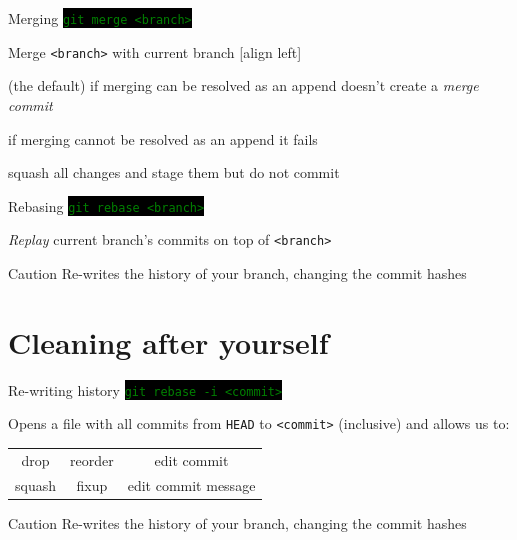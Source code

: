 \documentclass[
14pt,
aspectratio=169,
usenames,
dvipsnames,
x11names]{beamer}
\newcommand{\code}[1]{{\small\colorbox{black}{\textcolor{green}{\texttt{#1}}}}}
\begin{document}
\begin{frame}{Merging}
  \code{git merge <branch>}

  Merge \texttt{<branch>} with current branch
  [align left]
  \begin{description}[<+->] \setlength{\itemsep}{\fill}
  \item[\texttt{--ff~~~~~}] (the \alert{default}) if merging can be resolved as an append doesn't create a \textit{merge commit}
  \item[\texttt{--ff-only}] if merging cannot be resolved as an append it fails
  \item[\texttt{--squash~}] squash all changes and stage them but do not commit
  \end{description}

\end{frame}

\begin{frame}{Rebasing}
  \code{git rebase <branch>}

  \textit{Replay} current branch's commits on top of \texttt{<branch>}

  \vfill
  \pause

  \begin{alertblock}{Caution}
    Re-writes the history of your branch, changing the commit hashes
  \end{alertblock}
\end{frame}

\section{Cleaning after yourself}

\begin{frame}{Re-writing history}
  \code{git rebase -i <commit>}

  Opens a file with all commits from \texttt{HEAD} to \texttt{<commit>} (inclusive) and allows us to:
  \begin{center}
    \def\arraystretch{1.5}
    \setlength\tabcolsep{2em}
    \begin{tabular}{c c c}
      drop   & reorder & edit commit \\
      squash & fixup   & edit commit message
    \end{tabular}
  \end{center}

  \begin{alertblock}{Caution}
    Re-writes the history of your branch, changing the commit hashes
  \end{alertblock}
\end{frame}
\end{document}
